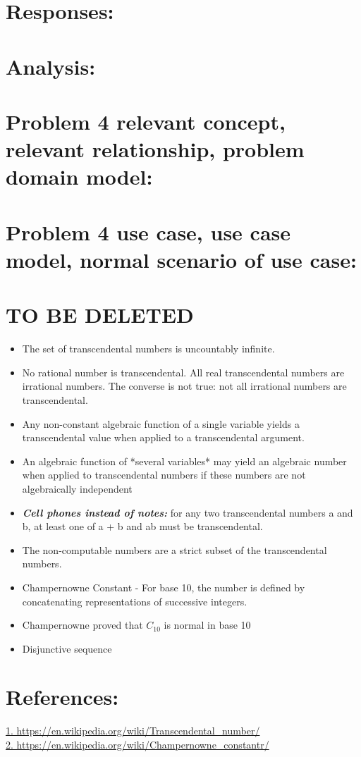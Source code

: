 \documentclass[10pt]{article}
\begin{document}
\section*{\normalsize \textbf{Responses:}}

\section*{\normalsize \textbf{Analysis:}}

\section*{\normalsize \textbf{Problem 4 relevant concept, relevant relationship, problem domain model:}}

\section*{\normalsize \textbf{Problem 4 use case, use case model, normal scenario of use case:}}

\section*{\normalsize \textbf{TO BE DELETED}}
\begin{itemize}
\item The set of transcendental numbers is uncountably infinite. 
\item  No rational number is transcendental. All real transcendental numbers are irrational numbers. The converse is not true: not all irrational numbers are transcendental.
\item  Any non-constant algebraic function of a single variable yields a transcendental value when applied to a transcendental argument.
\item  An algebraic function of *several variables* may yield an algebraic number when applied to transcendental numbers if these numbers are not algebraically independent
\item \textit{\textbf{Cell phones instead of notes:}} for any two transcendental numbers a and b, at least one of a + b and ab must be transcendental.
\item The non-computable numbers are a strict subset of the transcendental numbers.


\item Champernowne Constant - For base 10, the number is defined by concatenating representations of successive integers.
\item Champernowne proved that $C_{10}$ is normal in base 10
\item Disjunctive sequence

\end{itemize}

\section*{\normalsize \textbf{References:}}
\url{1. https://en.wikipedia.org/wiki/Transcendental_number/} \\
\url{2. https://en.wikipedia.org/wiki/Champernowne_constantr/} 
\end{document}
